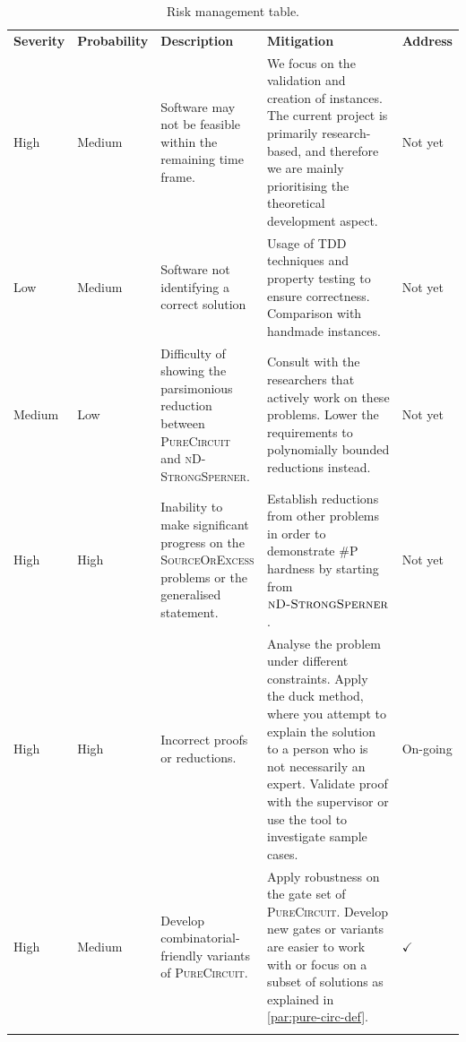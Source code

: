 \begin{xltabular}{0.95\linewidth}{|Z{1.2cm}|Z{1.75cm}|Y|Y|Z{1.2cm}|}
        \hline
        \textbf{Severity} & \textbf{Probability} & \textbf{Description} & \textbf{Mitigation} & \textbf{Address} \\
        \hhline{|=|=|=|=|=|}
        High   & Medium & Software may not be feasible within the remaining time frame. & We focus on the validation and creation of instances.
        The current project is primarily research-based, and therefore we are mainly prioritising the theoretical development aspect. & Not yet      \\ \hline
        Low    & Medium & Software not identifying a correct solution & Usage of TDD techniques and property testing to ensure correctness.  Comparison with handmade instances. & Not yet      \\ \hline
        Medium & Low    & Difficulty of showing the parsimonious reduction between  \textsc{PureCircuit} and  \textsc{nD-StrongSperner}. & Consult with the researchers that actively work on these problems. Lower the requirements
               to polynomially bounded reductions instead. &  Not yet \\ \hline
        High   & High   & Inability to make significant progress on the \textsc{SourceOrExcess} problems or the generalised statement. &
        Establish reductions from other problems in order to demonstrate \textsc{\#P} hardness by starting from $\textsc{nD-StrongSperner}$. & Not yet \\ \hline
        High   & High   & Incorrect proofs or reductions. &
        Analyse the problem under different constraints.
            Apply the duck method, where you attempt to explain the solution to a person who is not necessarily an expert. Validate proof with the supervisor or
               use the tool to investigate sample cases. & On-going  \\ \hline
        High   & Medium & Develop combinatorial-friendly variants of \textsc{PureCircuit}. & Apply robustness on the gate set of \textsc{PureCircuit}. Develop new gates or variants are easier to work with or focus
        on a subset of solutions as explained in \ref{par:pure-circ-def}. & $\checkmark$  \\ \hline
        \caption{Risk management table.} \label{tab:management:risk-management}
\end{xltabular}

%
%
